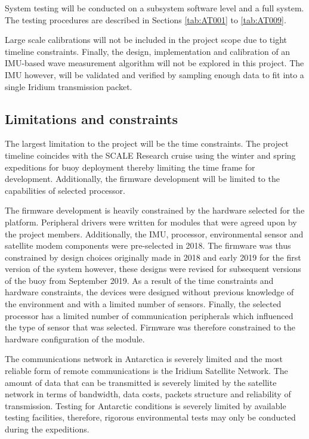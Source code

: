 System testing will be conducted on a subsystem software level and a full system. The testing procedures are described in Sections  \ref{tab:AT001} to \ref{tab:AT009}. 

Large scale calibrations will not be included in the project scope due to tight timeline constraints. Finally, the  design, implementation and calibration of an IMU-based wave measurement algorithm will not be explored in this project. The IMU however, will be validated and verified by sampling enough data to fit into a single Iridium transmission packet. 

\subsection{Limitations and constraints}

The largest limitation to the project will be the time constraints. The project timeline coincides with the SCALE Research cruise using the winter and spring expeditions for buoy deployment thereby limiting the time frame for development. Additionally, the firmware development will be limited to the capabilities of selected processor. \par 

The firmware development is heavily constrained by the hardware selected for the platform. Peripheral drivers were written for modules that were agreed upon by the project members. Additionally, the IMU, processor, environmental sensor and satellite modem components were pre-selected in 2018. The firmware was thus constrained by design choices originally made in 2018 and early 2019 for the first version of the system however, these designs were revised for subsequent versions of the buoy from September 2019. As a result of the time constraints and hardware constraints, the devices were designed without previous knowledge of the environment and with a limited number of sensors.  Finally, the selected processor has a limited number of communication peripherals which influenced the type of sensor that was selected. Firmware was therefore constrained to the hardware configuration of the module.

The communications network in Antarctica is severely limited and the most reliable form of remote communications is the Iridium Satellite Network. The amount of data that can be transmitted is severely limited by the satellite network in terms of bandwidth, data costs, packets structure and reliability of transmission. Testing for Antarctic conditions is severely limited by available testing facilities, therefore, rigorous environmental tests may only be conducted during the expeditions.\par 

